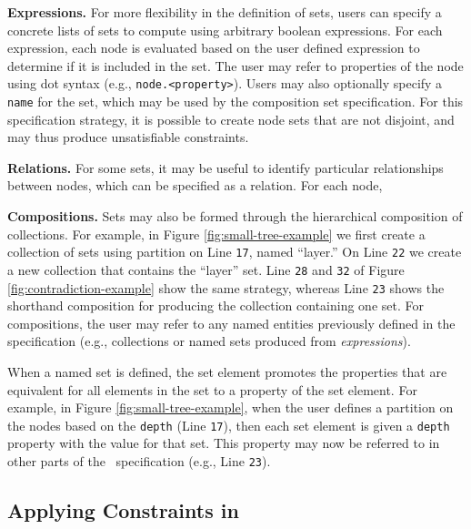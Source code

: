\textbf{Expressions.} For more flexibility in the definition of sets, users
can specify a concrete lists of sets to compute using arbitrary boolean
expressions. For each expression, each node is evaluated based on the user
defined expression to determine if it is included in the set. The user may
refer to properties of the node using dot syntax (e.g.,
\texttt{node.<property>}). Users may also optionally specify a
\texttt{name} for the set, which may be used by the composition set
specification. For this specification strategy, it is possible to create
node sets that are not disjoint, and may thus produce unsatisfiable
constraints. 

\textbf{Relations.} For some sets, it may be useful to identify particular
relationships between nodes, which can be specified as a relation. For each
node, 

\contradictionExample

\textbf{Compositions.} Sets may also be formed through the hierarchical
composition of collections. For example, in Figure
\ref{fig:small-tree-example} we first create a collection of sets using
partition on Line \texttt{17}, named ``layer.'' On Line \texttt{22} we
create a new collection that contains the ``layer'' set. Line \texttt{28}
and \texttt{32} of Figure \ref{fig:contradiction-example} show the same
strategy, whereas Line \texttt{23} shows the shorthand composition for
producing the collection containing one set. For compositions, the user may
refer to any named entities previously defined in the specification (e.g.,
collections or named sets produced from \emph{expressions}).


When a named set is defined, the set element promotes the properties that
are equivalent for all elements in the set to a property of the set
element. For example, in Figure \ref{fig:small-tree-example}, when the user
defines a partition on the nodes based on the \texttt{depth} (Line
\texttt{17}), then each set element is given a \texttt{depth} property with
the value for that set. This property may now be referred to in other parts
of the \projectname\ specification (e.g., Line \texttt{23}).


\subsection{Applying Constraints in \projectname}

